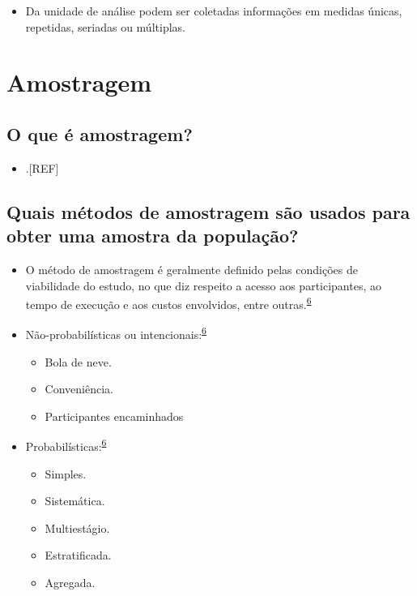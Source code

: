 \documentclass[
  a4paper,
]{book}
\providecommand{\tightlist}{%
  \setlength{\itemsep}{0pt}\setlength{\parskip}{0pt}}
\begin{document}
\begin{itemize}
\tightlist
\item
  Da unidade de análise podem ser coletadas informações em medidas únicas, repetidas, seriadas ou múltiplas.
\end{itemize}

\hypertarget{amostragem}{%
\section{Amostragem}\label{amostragem}}

\hypertarget{o-que-uxe9-amostragem}{%
\subsection{O que é amostragem?}\label{o-que-uxe9-amostragem}}

\begin{itemize}
\tightlist
\item
  .{[}REF{]}
\end{itemize}

\hypertarget{quais-muxe9todos-de-amostragem-suxe3o-usados-para-obter-uma-amostra-da-populauxe7uxe3o}{%
\subsection{Quais métodos de amostragem são usados para obter uma amostra da população?}\label{quais-muxe9todos-de-amostragem-suxe3o-usados-para-obter-uma-amostra-da-populauxe7uxe3o}}

\begin{itemize}
\item
  O método de amostragem é geralmente definido pelas condições de viabilidade do estudo, no que diz respeito a acesso aos participantes, ao tempo de execução e aos custos envolvidos, entre outras.\textsuperscript{\protect\hyperlink{ref-Banerjee2010}{6}}
\item
  Não-probabilísticas ou intencionais:\textsuperscript{\protect\hyperlink{ref-Banerjee2010}{6}}

  \begin{itemize}
  \item
    Bola de neve.
  \item
    Conveniência.
  \item
    Participantes encaminhados
  \end{itemize}
\item
  Probabilísticas:\textsuperscript{\protect\hyperlink{ref-Banerjee2010}{6}}

  \begin{itemize}
  \item
    Simples.
  \item
    Sistemática.
  \item
    Multiestágio.
  \item
    Estratificada.
  \item
    Agregada.
  \end{itemize}
\end{itemize}
\end{document}
